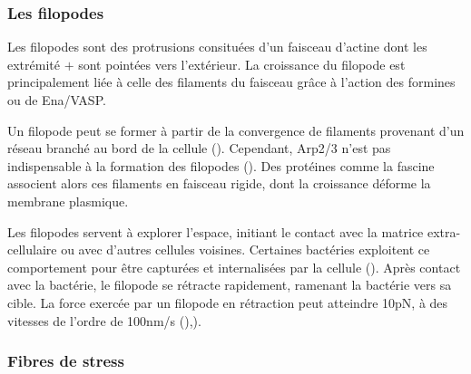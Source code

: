 \subsubsection{Les filopodes}

Les filopodes sont des protrusions consituées d'un faisceau d'actine dont les extrémité $+$ sont pointées vers l'extérieur. 
La croissance du filopode est principalement liée à celle des filaments du faisceau grâce à l'action des formines ou de Ena/VASP. 

Un filopode peut se former à partir de la convergence de filaments provenant d'un réseau branché au bord de la cellule (\cite{small_actin_1995}). Cependant, Arp2/3 n'est pas indispensable à la formation des filopodes (\cite{wu_arp2/3_2012}). 
Des protéines comme la fascine associent alors ces filaments en faisceau rigide, dont la croissance déforme la membrane plasmique. 

Les filopodes servent à explorer l'espace, initiant le contact avec la matrice extra-cellulaire ou avec d'autres cellules voisines. 
Certaines bactéries exploitent ce comportement pour être capturées et internalisées par la cellule (\cite{romero_atp-mediated_2011}). 
Après contact avec la bactérie, le filopode se rétracte rapidement, ramenant la bactérie vers sa cible.
La force exercée par un filopode en rétraction peut atteindre 10pN, à des vitesses de l'ordre de 100nm/s (\cite{vonna_micromechanics_2007}),\cite{romero_atp-mediated_2011}). 



\subsubsection{Fibres de stress}

